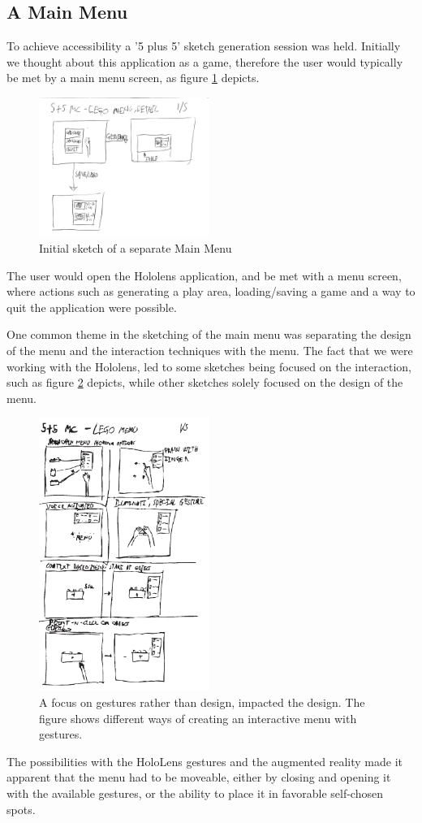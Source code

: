 \subsection{A Main Menu}
To achieve accessibility a '5 plus 5' sketch generation session was held. Initially we thought about this application as a game, therefore the user would typically be met by a main menu screen, as figure \ref{fig:menu8} depicts.
\begin{figure}[t]
	\centering
	\includegraphics[width=210px]{figures/Menu/menu8_1.pdf}
	\caption{Initial sketch of a separate Main Menu}
	\label{fig:menu8}
\end{figure}
The user would open the Hololens application, and be met with a menu screen, where actions such as generating a play area, loading/saving a game and a way to quit the application were possible. \par
One common theme in the sketching of the main menu was separating the design of the menu and the interaction techniques with the menu. The fact that we were working with the Hololens, led to some sketches being focused on the interaction, such as figure \ref{fig:menugesture} depicts,  while other sketches solely focused on the design of the menu.\par
\begin{figure}[t]
	\centering
	\includegraphics[width=210px]{figures/Menu/menu5_1.pdf}
	\caption{A focus on gestures rather than design, impacted the design. The figure shows different ways of creating an interactive menu with gestures.}
	\label{fig:menugesture}
\end{figure}
\par
The possibilities with the HoloLens gestures and the augmented reality made it apparent that the menu had to be moveable, either by closing and opening it with the available gestures, or the ability to place it in favorable self-chosen spots.
